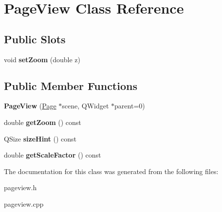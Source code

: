 \hypertarget{class_page_view}{
\section{PageView Class Reference}
\label{class_page_view}
}
\subsection*{Public Slots}
\begin{DoxyCompactItemize}
\item 
\hypertarget{class_page_view_aee51402a8cdc9cd20654ef923cd08253}{
void {\bfseries setZoom} (double z)}
\label{class_page_view_aee51402a8cdc9cd20654ef923cd08253}

\end{DoxyCompactItemize}
\subsection*{Public Member Functions}
\begin{DoxyCompactItemize}
\item 
\hypertarget{class_page_view_ad6acbba0122143329dfe167c05557920}{
{\bfseries PageView} (\hyperlink{class_page}{Page} $\ast$scene, QWidget $\ast$parent=0)}
\label{class_page_view_ad6acbba0122143329dfe167c05557920}

\item 
\hypertarget{class_page_view_a8a101eafa1e225f233ddd450161a8fe1}{
double {\bfseries getZoom} () const }
\label{class_page_view_a8a101eafa1e225f233ddd450161a8fe1}

\item 
\hypertarget{class_page_view_ad1ccebf4e0888bd2c5657dcded57b3ce}{
QSize {\bfseries sizeHint} () const }
\label{class_page_view_ad1ccebf4e0888bd2c5657dcded57b3ce}

\item 
\hypertarget{class_page_view_a35f31d8231945826218334a01b0e88ed}{
double {\bfseries getScaleFactor} () const }
\label{class_page_view_a35f31d8231945826218334a01b0e88ed}

\end{DoxyCompactItemize}


The documentation for this class was generated from the following files:\begin{DoxyCompactItemize}
\item 
pageview.h\item 
pageview.cpp\end{DoxyCompactItemize}
